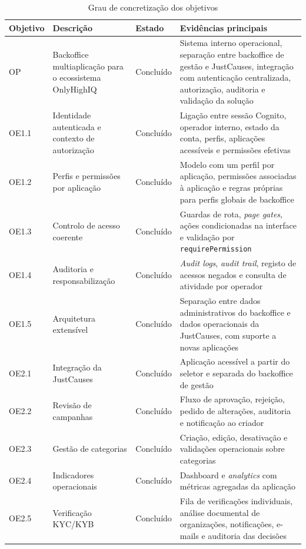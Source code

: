 \begin{table}[H]
\caption{Grau de concretização dos objetivos}
\label{tab:objetivos}
\begin{center}
\scriptsize
\begin{tabular}{|p{1.5cm}|p{4.1cm}|p{1.4cm}|p{5cm}|}
\hline
\textbf{Objetivo} & \textbf{Descrição} & \textbf{Estado} & \textbf{Evidências principais} \\ \hline
OP & Backoffice multiaplicação para o ecossistema OnlyHighIQ & Concluído & Sistema interno operacional, separação entre backoffice de gestão e JustCauses, integração com autenticação centralizada, autorização, auditoria e validação da solução \\ \hline
OE1.1 & Identidade autenticada e contexto de autorização & Concluído & Ligação entre sessão Cognito, operador interno, estado da conta, perfis, aplicações acessíveis e permissões efetivas \\ \hline
OE1.2 & Perfis e permissões por aplicação & Concluído & Modelo com um perfil por aplicação, permissões associadas à aplicação e regras próprias para perfis globais de backoffice \\ \hline
OE1.3 & Controlo de acesso coerente & Concluído & Guardas de rota, \textit{page gates}, ações condicionadas na interface e validação por \texttt{requirePermission} \\ \hline
OE1.4 & Auditoria e responsabilização & Concluído & \textit{Audit logs}, \textit{audit trail}, registo de acessos negados e consulta de atividade por operador \\ \hline
OE1.5 & Arquitetura extensível & Concluído & Separação entre dados administrativos do backoffice e dados operacionais da JustCauses, com suporte a novas aplicações \\ \hline
OE2.1 & Integração da JustCauses & Concluído & Aplicação acessível a partir do seletor e separada do backoffice de gestão \\ \hline
OE2.2 & Revisão de campanhas & Concluído & Fluxo de aprovação, rejeição, pedido de alterações, auditoria e notificação ao criador \\ \hline
OE2.3 & Gestão de categorias & Concluído & Criação, edição, desativação e validações operacionais sobre categorias \\ \hline
OE2.4 & Indicadores operacionais & Concluído & Dashboard e \textit{analytics} com métricas agregadas da aplicação \\ \hline
OE2.5 & Verificação KYC/KYB & Concluído & Fila de verificações individuais, análise documental de organizações, notificações, e-mails e auditoria das decisões \\ \hline
\end{tabular}
\end{center}
\end{table}

